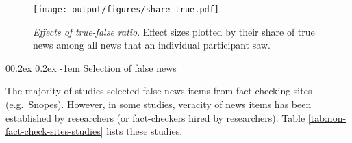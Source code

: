 \documentclass[
  doc,floatsintext]{apa6}
\makeatletter
\let\oldparagraph\paragraph
\renewcommand{\paragraph}{
    \@ifstar
      \xxxParagraphStar
      \xxxParagraphNoStar
  }
\newcommand{\xxxParagraphStar}[1]{\oldparagraph*{#1}\mbox{}}
\newcommand{\xxxParagraphNoStar}[1]{\oldparagraph{#1}\mbox{}}
\renewcommand{\paragraph}{\@startsection{paragraph}{4}{\parindent}%
  {0\baselineskip \@plus 0.2ex \@minus 0.2ex}%
  {-1em}%
  {\normalfont\normalsize\bfseries\itshape\typesectitle}}
\makeatother
\begin{document}
\begin{figure}
\centering
\texttt{[image: output/figures/share-true.pdf]}
\caption{\label{fig:share-true}\emph{Effects of true-false ratio}. Effect sizes plotted by their share of true news among all news that an individual participant saw.}
\end{figure}

\paragraph{Selection of false news}\label{selection-of-false-news}

The majority of studies selected false news items from fact checking sites (e.g.~Snopes). However, in some studies, veracity of news items has been established by researchers (or fact-checkers hired by researchers). Table \ref{tab:non-fact-check-sites-studies} lists these studies.
\end{document}
